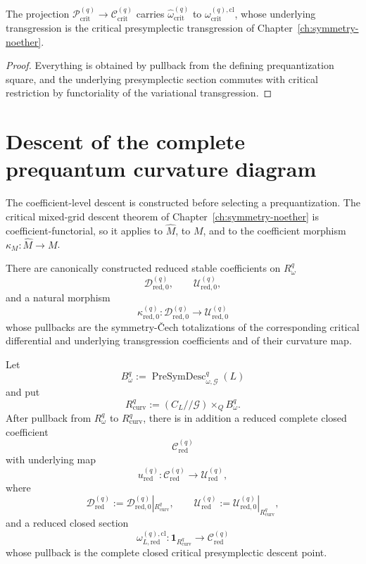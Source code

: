 \begin{proposition}
\label{prop:prequantum-curvature-critical-restriction}
The projection
$\mathscr P_{\mathrm{crit}}^{(q)}\to\mathscr C_{\mathrm{crit}}^{(q)}$
carries $\widehat\omega_{\mathrm{crit}}^{(q)}$ to
$\omega_{\mathrm{crit}}^{(q),\mathrm{cl}}$, whose underlying transgression is the
critical presymplectic transgression of
Chapter~\ref{ch:symmetry-noether}.
\end{proposition}

\begin{proof}
Everything is obtained by pullback from the defining prequantization square, and
the underlying presymplectic section commutes with critical restriction by
functoriality of the variational transgression.
\end{proof}

\section{Descent of the complete prequantum curvature diagram}
\label{sec:prequantum-curvature-diagram-descent}

The coefficient-level descent is constructed before selecting a prequantization.
The critical mixed-grid descent theorem of
Chapter~\ref{ch:symmetry-noether} is coefficient-functorial, so it applies to
$\widehat M$, to $M$, and to the coefficient morphism
$\kappa_M:\widehat M\to M$.

\begin{theorem}
\label{thm:prequantum-curvature-diagram-descent}
There are canonically constructed reduced stable coefficients on $R_\omega^q$
\[
\mathscr D_{\mathrm{red},0}^{(q)},
\qquad
\mathscr U_{\mathrm{red},0}^{(q)},
\]
and a natural morphism
\[
\kappa_{\mathrm{red},0}^{(q)}:
\mathscr D_{\mathrm{red},0}^{(q)}
\longrightarrow
\mathscr U_{\mathrm{red},0}^{(q)}
\]
whose pullbacks are the symmetry-\v{C}ech totalizations of the corresponding
critical differential and underlying transgression coefficients and of their
curvature map.

Let
\[
B_\omega^q
:=
\operatorname{PreSymDesc}_{\omega,\mathcal G}^{q}(L)
\]
and put
\[
R_{\mathrm{curv}}^q
:=
(C_L//\mathcal G)\times_QB_\omega^q.
\]
After pullback from $R_\omega^q$ to $R_{\mathrm{curv}}^q$, there is in addition a
reduced complete closed coefficient
\[
\mathscr C_{\mathrm{red}}^{(q)}
\]
with underlying map
\[
u_{\mathrm{red}}^{(q)}:
\mathscr C_{\mathrm{red}}^{(q)}
\longrightarrow
\mathscr U_{\mathrm{red}}^{(q)},
\]
where
\[
\mathscr D_{\mathrm{red}}^{(q)}
:=
\mathscr D_{\mathrm{red},0}^{(q)}|_{R_{\mathrm{curv}}^q},
\qquad
\mathscr U_{\mathrm{red}}^{(q)}
:=
\mathscr U_{\mathrm{red},0}^{(q)}|_{R_{\mathrm{curv}}^q},
\]
and a reduced closed section
\[
\omega_{L,\mathrm{red}}^{(q),\mathrm{cl}}:
\mathbf1_{R_{\mathrm{curv}}^q}
\longrightarrow
\mathscr C_{\mathrm{red}}^{(q)}
\]
whose pullback is the complete closed critical presymplectic descent point.
\end{theorem}

